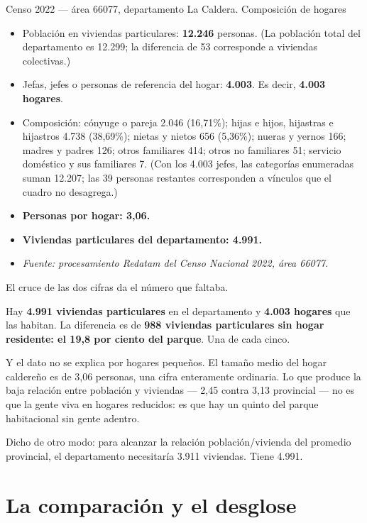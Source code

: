 \begin{ficha}{Censo 2022 --- área 66077, departamento La Caldera. Composición de hogares}
\begin{itemize}[leftmargin=*,nosep]
\item Población en viviendas particulares: \textbf{12.246} personas. (La población total del departamento es 12.299; la diferencia de 53 corresponde a viviendas colectivas.)
\item Jefas, jefes o personas de referencia del hogar: \textbf{4.003}. Es decir, \textbf{4.003 hogares}.
\item Composición: cónyuge o pareja 2.046 (16,71\%); hijas e hijos, hijastras e hijastros 4.738 (38,69\%); nietas y nietos 656 (5,36\%); nueras y yernos 166; madres y padres 126; otros familiares 414; otros no familiares 51; servicio doméstico y sus familiares 7. (Con los 4.003 jefes, las categorías enumeradas suman 12.207; las 39 personas restantes corresponden a vínculos que el cuadro no desagrega.)
\item \textbf{Personas por hogar: 3,06.}
\item \textbf{Viviendas particulares del departamento: 4.991.}
\item \textit{Fuente: procesamiento Redatam del Censo Nacional 2022, área 66077.}
\end{itemize}
\end{ficha}

El cruce de las dos cifras da el número que faltaba.

Hay \textbf{4.991 viviendas particulares} en el departamento y \textbf{4.003 hogares} que las habitan. La diferencia es de \textbf{988 viviendas particulares sin hogar residente: el 19,8 por ciento del parque}. Una de cada cinco.

Y el dato no se explica por hogares pequeños. El tamaño medio del hogar caldereño es de 3,06 personas, una cifra enteramente ordinaria. Lo que produce la baja relación entre población y viviendas --- 2,45 contra 3,13 provincial --- no es que la gente viva en hogares reducidos: es que hay un quinto del parque habitacional sin gente adentro.

Dicho de otro modo: para alcanzar la relación población/vivienda del promedio provincial, el departamento necesitaría 3.911 viviendas. Tiene 4.991.

\section{La comparación y el desglose}

